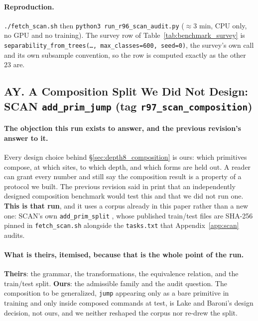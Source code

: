 \paragraph{Reproduction.} \texttt{./fetch\_scan.sh} then \texttt{python3 run\_r96\_scan\_audit.py} ($\approx3$ min, CPU only, no GPU and no training). The survey row of Table~\ref{tab:benchmark_survey} is \texttt{separability\_from\_trees(\ldots, max\_classes=600, seed=0)}, the survey's own call and its own subsample convention, so the row is computed exactly as the other $23$ are.

\subsection*{AY. A Composition Split We Did Not Design: SCAN \texttt{add\_prim\_jump} (tag \texttt{r97\_scan\_composition})}

\paragraph{The objection this run exists to answer, and the previous revision's answer to it.} Every design choice behind \S\ref{sec:depth8_composition} is ours: which primitives compose, at which sites, to which depth, and which forms are held out. A reader can grant every number and still say the composition result is a property of a protocol we built. The previous revision said in print that an independently designed composition benchmark would test this and that we did not run one. \textbf{This is that run}, and it uses a corpus already in this paper rather than a new one: SCAN's own \texttt{add\_prim\_split} \citep{lake2018generalization}, whose published train/test files are SHA-256 pinned in \texttt{fetch\_scan.sh} alongside the \texttt{tasks.txt} that Appendix~\ref{app:scan} audits.

\paragraph{What is theirs, itemised, because that is the whole point of the run.} \textbf{Theirs}: the grammar, the transformations, the equivalence relation, and the train/test split. \textbf{Ours}: the admissible family and the audit question. The composition to be generalized, \texttt{jump} appearing only as a bare primitive in training and only inside composed commands at test, is Lake and Baroni's design decision, not ours, and we neither reshaped the corpus nor re-drew the split.

